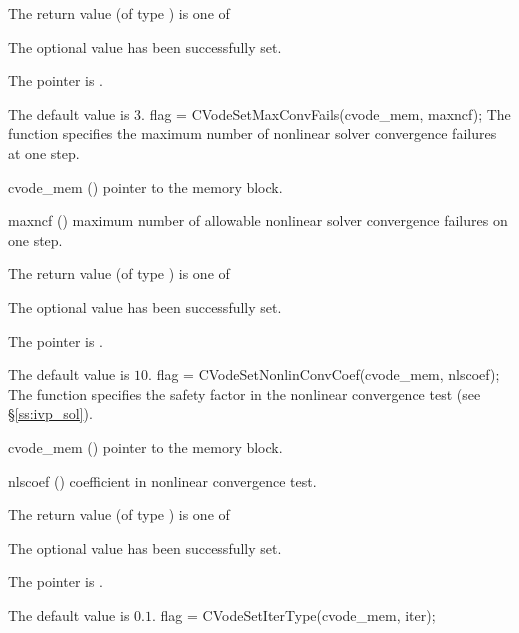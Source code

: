 {
  The return value  (of type ) is one of
  \begin{args}
  \item[\Id{CV\_SUCCESS}] 
    The optional value has been successfully set.
  \item[\Id{CV\_MEM\_NULL}]
    The  pointer is .
  \end{args}
}
{
  The default value is $3$.
}
{
flag = CVodeSetMaxConvFails(cvode\_mem, maxncf);
}
{
  The function  specifies the
  maximum number of nonlinear solver convergence failures at one step.
}
{
  \begin{args}
  \item[cvode\_mem] ()
    pointer to the {\cvode} memory block.
  \item[maxncf] ()
    maximum number of allowable nonlinear solver convergence failures
    on one step.
  \end{args}
}
{
  The return value  (of type ) is one of
  \begin{args}
  \item[\Id{CV\_SUCCESS}] 
    The optional value has been successfully set.
  \item[\Id{CV\_MEM\_NULL}]
    The  pointer is .
  \end{args}
}
{
  The default value is $10$.
}
{
flag = CVodeSetNonlinConvCoef(cvode\_mem, nlscoef);
}
{
  The function  specifies the safety factor
  in the nonlinear convergence test (see \S\ref{ss:ivp_sol}).
}
{
  \begin{args}
  \item[cvode\_mem] ()
    pointer to the {\cvode} memory block.
  \item[nlscoef] ()
    coefficient in nonlinear convergence test.
  \end{args}
}
{
  The return value  (of type ) is one of
  \begin{args}
  \item[\Id{CV\_SUCCESS}] 
    The optional value has been successfully set.
  \item[\Id{CV\_MEM\_NULL}]
    The  pointer is .
  \end{args}
}
{
  The default value is $0.1$.
}
{
flag = CVodeSetIterType(cvode\_mem, iter);
}
